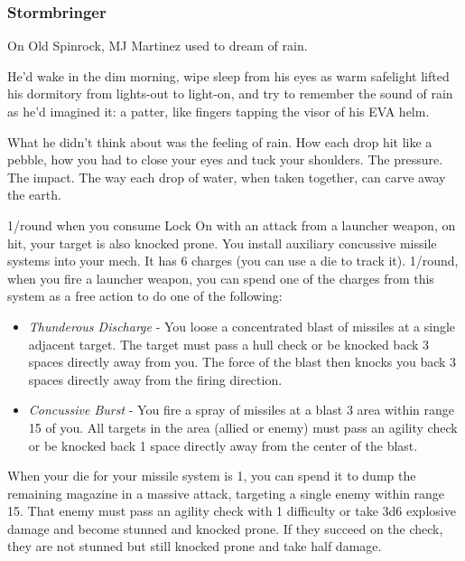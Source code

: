 \subsubsection{Stormbringer}

\begin{talent}
{On Old Spinrock, MJ Martinez used to dream of rain.

He’d wake in the dim morning, wipe sleep from his eyes as warm safelight lifted his dormitory from lights-out to light-on, and try to remember the sound of rain as he’d imagined it: a patter, like fingers tapping the visor of his EVA helm.

What he didn’t think about was the feeling of rain. How each drop hit like a pebble, how you had to close your eyes and tuck your shoulders. The pressure. The impact. The way each drop of water, when taken together, can carve away the earth.}

1/round when you consume Lock On with an attack from a launcher weapon, on hit, your target is also knocked prone. 
You install auxiliary concussive missile systems into your mech. It has 6 charges (you can use a die to track it). 1/round, when you fire a launcher weapon, you can spend one of the charges from this system as a free action to do one of the following: 
\begin{itemize}
\item \textit{Thunderous Discharge} - You loose a concentrated blast of missiles at a single adjacent target. The target must pass a hull check or be knocked back 3 spaces directly away from you. The force of the blast then knocks you back 3 spaces directly away from the firing direction. 
\item \textit{Concussive Burst} - You fire a spray of missiles at a blast 3 area within range 15 of you. All targets in the area (allied or enemy) must pass an agility check or be knocked back 1 space directly away from the center of the blast.
\end{itemize}
When your die for your missile system is 1, you can spend it to dump the remaining magazine in a massive attack, targeting a single enemy within range 15. That enemy must pass an agility check with 1 difficulty or take 3d6 explosive damage and become stunned and knocked prone. If they succeed on the check, they are not stunned but still knocked prone and take half damage.
\end{talent}
